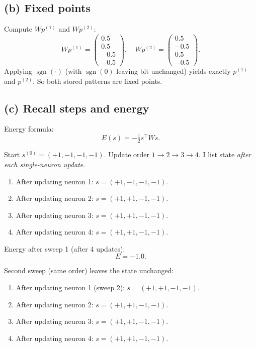 \documentclass[11pt,a4paper]{article}
\begin{document}
\subsection{(b) Fixed points}
Compute \(Wp^{(1)}\) and \(Wp^{(2)}\):
\[
W p^{(1)}=\begin{pmatrix}0.5\\[2pt]0.5\\[2pt]-0.5\\[2pt]-0.5\end{pmatrix},\quad
W p^{(2)}=\begin{pmatrix}0.5\\[2pt]-0.5\\[2pt]0.5\\[2pt]-0.5\end{pmatrix}.
\]
Applying \(\operatorname{sgn}(\cdot)\) (with \(\operatorname{sgn}(0)\) leaving bit unchanged) yields exactly \(p^{(1)}\) and \(p^{(2)}\). So both stored patterns are fixed points.

\subsection{(c) Recall steps and energy}
Energy formula:
\[
E(s)=-\tfrac12 s^\top W s.
\]

Start \(s^{(0)}=(+1,-1,-1,-1)\). Update order \(1\to2\to3\to4\). I list state \emph{after each single-neuron update}.

\begin{enumerate}[label=\textbf{Update \arabic*:},leftmargin=*,nosep]
  \item After updating neuron 1: \(s=(+1,-1,-1,-1)\).
  \item After updating neuron 2: \(s=(+1,+1,-1,-1)\).
  \item After updating neuron 3: \(s=(+1,+1,-1,-1)\).
  \item After updating neuron 4: \(s=(+1,+1,-1,-1)\).
\end{enumerate}

Energy after sweep 1 (after 4 updates):
\[
E=-1.0.
\]

Second sweep (same order) leaves the state unchanged:
\begin{enumerate}[label=\textbf{Update \arabic*:},start=5,leftmargin=*,nosep]
  \item After updating neuron 1 (sweep 2): \(s=(+1,+1,-1,-1)\).
  \item After updating neuron 2: \(s=(+1,+1,-1,-1)\).
  \item After updating neuron 3: \(s=(+1,+1,-1,-1)\).
  \item After updating neuron 4: \(s=(+1,+1,-1,-1)\).
\end{enumerate}
\end{document}
